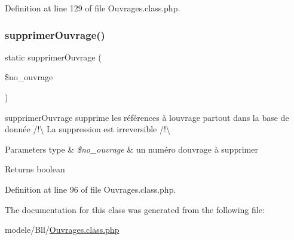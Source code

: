 Definition at line 129 of file Ouvrages.\+class.\+php.

\mbox{\label{class_ouvrages_ad1b8821c79904425d52ab89a4749a5a1}} 
\subsubsection{\texorpdfstring{supprimer\+Ouvrage()}{supprimerOuvrage()}}
{\footnotesize\ttfamily static supprimer\+Ouvrage (\begin{DoxyParamCaption}\item[{}]{\$no\+\_\+ouvrage }\end{DoxyParamCaption})\hspace{0.3cm}{\ttfamily [static]}}

supprimer\+Ouvrage supprime les références à l\textquotesingle{}ouvrage partout dans la base de donnée /!\textbackslash{} La suppression est irreversible /!\textbackslash{} 
\begin{DoxyParams}[1]{Parameters}
type & {\em \$no\+\_\+ouvrage} & un numéro d\textquotesingle{}ouvrage à supprimer \\
\hline
\end{DoxyParams}
\begin{DoxyReturn}{Returns}
boolean 
\end{DoxyReturn}


Definition at line 96 of file Ouvrages.\+class.\+php.



The documentation for this class was generated from the following file\+:\begin{DoxyCompactItemize}
\item 
modele/\+Bll/\hyperlink{_ouvrages_8class_8php}{Ouvrages.\+class.\+php}\end{DoxyCompactItemize}
